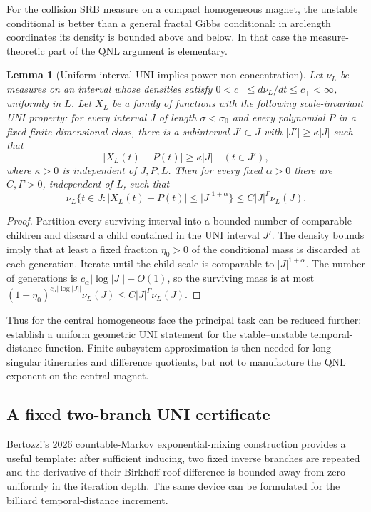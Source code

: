 \documentclass[11pt]{article}
\newtheorem{lemma}[theorem]{Lemma}
\begin{document}
For the collision SRB measure on a compact homogeneous magnet, the unstable
conditional is better than a general fractal Gibbs conditional: in arclength
coordinates its density is bounded above and below.  In that case the
measure-theoretic part of the QNL argument is elementary.

\begin{lemma}[Uniform interval UNI implies power non-concentration]
\label{lem:interval-uni-qnl}
Let $\nu_L$ be measures on an interval whose densities satisfy
$0<c_-\le d\nu_L/dt\le c_+<\infty$, uniformly in $L$.  Let $X_L$ be a family
of functions with the following scale-invariant UNI property: for every
interval $J$ of length $\sigma<\sigma_0$ and every polynomial $P$ in a fixed
finite-dimensional class, there is a subinterval
$J'\subset J$ with $|J'|\ge\kappa|J|$ such that
\[
 |X_L(t)-P(t)|\ge\kappa|J|\quad(t\in J'),
\]
where $\kappa>0$ is independent of $J,P,L$.  Then for every fixed
$\alpha>0$ there are $C,\Gamma>0$, independent of $L$, such that
\[
 \nu_L\{t\in J:|X_L(t)-P(t)|\le |J|^{1+\alpha}\}
 \le C|J|^\Gamma\nu_L(J).
\]
\end{lemma}

\begin{proof}
Partition every surviving interval into a bounded number of comparable
children and discard a child contained in the UNI interval $J'$.  The density
bounds imply that at least a fixed fraction $\eta_0>0$ of the conditional
mass is discarded at each generation.  Iterate until the child scale is
comparable to $|J|^{1+\alpha}$.  The number of generations is
$c_\alpha|\log|J||+O(1)$, so the surviving mass is at most
$(1-\eta_0)^{c_\alpha|\log|J||}\nu_L(J)
\le C|J|^\Gamma\nu_L(J)$.
\end{proof}

Thus for the central homogeneous face the principal task can be reduced
further: establish a uniform geometric UNI statement for the
stable--unstable temporal-distance function.  Finite-subsystem approximation
is then needed for long singular itineraries and difference quotients, but
not to manufacture the QNL exponent on the central magnet.

\subsection{A fixed two-branch UNI certificate}

Bertozzi's 2026 countable-Markov exponential-mixing construction provides a
useful template: after sufficient inducing, two fixed inverse branches are
repeated and the derivative of their Birkhoff-roof difference is bounded away
from zero uniformly in the iteration depth.  The same device can be formulated
for the billiard temporal-distance increment.
\end{document}
